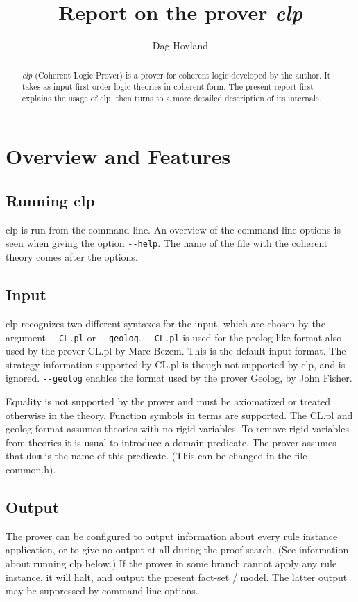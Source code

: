 \documentclass[a4paper]{article}
\author{Dag Hovland}
\title{Report on the prover \emph{clp}}
\begin{document}
\maketitle
\begin{abstract}
  \emph{clp} (Coherent Logic Prover) is a prover for coherent logic developed by the author. It takes as input first order logic theories in coherent form. The present report first explains the usage of clp, then turns to a more detailed description of its internals.
\end{abstract}
\section{Overview and Features}
\subsection{Running clp}
clp is run from the command-line. An overview of the command-line options is seen when giving the option \verb|--help|. The name of the file with the coherent theory comes after the options. 

\subsection{Input}
clp recognizes two different syntaxes for the input, which are chosen by the argument \verb|--CL.pl| or \verb|--geolog|. \verb|--CL.pl| is used for the prolog-like format also used by the prover CL.pl by Marc Bezem. This is the default input format. The strategy information supported by CL.pl is though not supported by clp, and is ignored. \verb|--geolog| enables the format used by the prover Geolog, by John Fisher.


Equality is not supported by the prover and must be axiomatized or treated otherwise in the theory. Function symbols in terms are supported. The CL.pl and geolog format assumes theories with no rigid variables. To remove rigid variables from theories it is usual to introduce a domain predicate. The prover assumes that \verb|dom| is the name of this predicate. (This can be changed in the file common.h). %

\subsection{Output}
The prover can be configured to output information about every rule instance application, or to give no output at all during the proof search. (See information about running clp below.) If the prover in some branch cannot apply any rule instance, it will halt, and output the present fact-set / model. The latter output may be suppressed by command-line options. 
\end{document}
